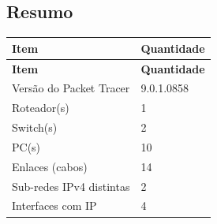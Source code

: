 \subsection{Resumo}
\begingroup\scriptsize\setlength{\tabcolsep}{3pt}
\begin{longtable}{@{}p{}p{}@{}}
\toprule \textbf{Item} & \textbf{Quantidade} \\\midrule\endfirsthead
\toprule \textbf{Item} & \textbf{Quantidade} \\\midrule\endhead
Versão do Packet Tracer & 9.0.1.0858 \\
Roteador(s) & 1 \\
Switch(s) & 2 \\
PC(s) & 10 \\
Enlaces (cabos) & 14 \\
Sub-redes IPv4 distintas & 2 \\
Interfaces com IP & 4 \\
\bottomrule
\end{longtable}\endgroup

